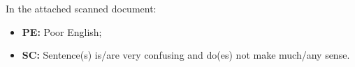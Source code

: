 \documentclass[14pt,twoside]{report}
\begin{document}
In the attached scanned document:
\begin{itemize}
\item {\bf PE:} Poor English;
\item {\bf SC:} Sentence(s) is/are very confusing and do(es) not make much/any sense.   
\end{itemize}

\clearpage



\end{document}
